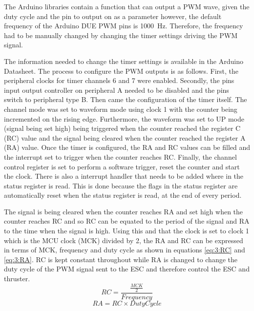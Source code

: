 	\vspace{0.4cm}
	The Arduino libraries contain a function that can output a PWM wave, given the duty cycle and the pin to output on as a parameter however, the default frequency of the Arduino DUE PWM pins is \SI{1000}{\hertz}. Therefore, the frequency had to be manually changed by changing the timer settings driving the PWM signal.\par
	\vspace{0.4cm}
	The information needed to change the timer settings is available in the Arduino Datasheet. The process to configure the PWM outputs is as follows. First, the peripheral clocks for timer channels 6 and 7 were enabled. Secondly, the pins input output controller on peripheral A needed to be disabled and the pins switch to peripheral type B. Then came the configuration of the timer itself. The channel mode was set to waveform mode using clock 1 with the counter being incremented on the rising edge. Furthermore, the waveform was set to UP mode (signal being set high) being triggered when the counter reached the register C (RC) value and the signal being cleared when the counter reached the register A (RA) value. Once the timer is configured, the RA and RC values can be filled and the interrupt set to trigger when the counter reaches RC. Finally, the channel control register is set to perform a software trigger, reset the counter and start the clock. There is also a interrupt handler that needs to be added where in the status register is read. This is done because the flags in the status register are automatically reset when the status register is read, at the end of every period.\par
	\vspace{0.4cm}
	The signal is being cleared when the counter reaches RA and set high when the counter reaches RC and so RC can be equated to the period of the signal and RA to the time when the signal is high. Using this and that the clock is set to clock 1 which is the MCU clock (MCK) divided by 2, the RA and RC can be expressed in terms of MCK, frequency and duty cycle as shown in equations \ref{eq:3:RC} and \ref{eq:3:RA}. RC is kept constant throughout while RA is changed to change the duty cycle of the PWM signal sent to the ESC and therefore control the ESC and thruster.
	\begin{equation}
		RC = \frac{\frac{MCK}{2}}{Frequency}
		\label{eq:3:RC}
	\end{equation}
	\begin{equation}
		RA = RC \times Duty Cycle
		\label{eq:3:RA}
	\end{equation}
